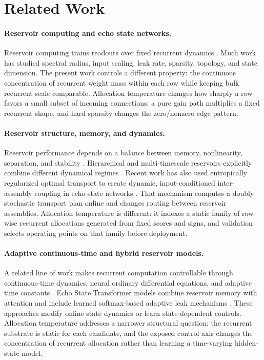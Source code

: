\documentclass[preprint,12pt,authoryear]{elsarticle}
\begin{document}
\section{Related Work}
\label{sec:related_work}

\paragraph{Reservoir computing and echo state networks.}
Reservoir computing trains readouts over fixed recurrent dynamics \citep{jaeger2001echo,maass2002real,lukosevicius2009reservoir}. Much work has studied spectral radius, input scaling, leak rate, sparsity, topology, and state dimension. The present work controls a different property: the continuous concentration of recurrent weight mass within each row while keeping bulk recurrent scale comparable. Allocation temperature changes how sharply a row favors a small subset of incoming connections; a pure gain path multiplies a fixed recurrent shape, and hard sparsity changes the zero/nonzero edge pattern.

\paragraph{Reservoir structure, memory, and dynamics.}
Reservoir performance depends on a balance between memory, nonlinearity, separation, and stability \citep{yildiz2012revisiting}. Hierarchical and multi-timescale reservoirs explicitly combine different dynamical regimes \citep{manneschi2021exploiting}. Recent work has also used entropically regularized optimal transport to create dynamic, input-conditioned inter-assembly coupling in echo-state networks \citep{singh2026ot}. That mechanism computes a doubly stochastic transport plan online and changes routing between reservoir assemblies. Allocation temperature is different: it indexes a static family of row-wise recurrent allocations generated from fixed scores and signs, and validation selects operating points on that family before deployment.

\paragraph{Adaptive continuous-time and hybrid reservoir models.}
A related line of work makes recurrent computation controllable through continuous-time dynamics, neural ordinary differential equations, and adaptive time constants \citep{chen2018neural,hasani2021liquid,hasani2022closed}. Echo State Transformer models combine reservoir memory with attention and include learned softmax-based adaptive leak mechanisms \citep{bendiouis2025est}. These approaches modify online state dynamics or learn state-dependent controls. Allocation temperature addresses a narrower structural question: the recurrent substrate is static for each candidate, and the exposed control axis changes the concentration of recurrent allocation rather than learning a time-varying hidden-state model.
\end{document}
